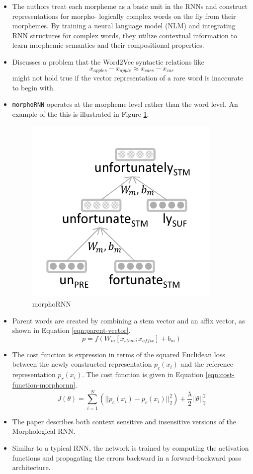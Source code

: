 \documentclass[11pt,a4paper]{article}
\begin{document}
  \begin{itemize}
    \item 
    The authors treat each morpheme as a basic unit in the RNNs and construct representations for morpho- logically complex words on the fly from their morphemes. By training a neural language model (NLM) and integrating RNN structures for complex words, they utilize contextual information to learn morphemic semantics and their compositional properties.
    \item 
    Discusses a problem that the Word2Vec syntactic relations like $$x_{apples} - x_{apple} \approx x_{cars} - x_{car}$$ might not hold true if the vector representation of a rare word is inaccurate to begin with.
    \item 
    \texttt{morphoRNN} operates at the morpheme level rather than the word level. An example of the this is illustrated in Figure \ref{fig:rnn-morphology}.
    \begin{figure}[ht]
      \centering
      \includegraphics[width=.4\textwidth]{rnn-morphology.png}
      \caption{morphoRNN}
      \label{fig:rnn-morphology}
    \end{figure}
    \item 
    Parent words are created by combining a stem vector and an affix vector, as shown in Equation \ref{eqn:parent-vector}.
    \begin{equation} \label{eqn:parent-vector}
      p = f (W_m [x_{stem} ; x_{affix}] + b_m)
    \end{equation}
    \item 
    The cost function is expression in terms of the squared Euclidean loss between the newly constructed representation $p_c(x_i)$ and the reference representation $p_r(x_i)$. The cost function is given in Equation \ref{eqn:cost-function-morphornn}.
    \begin{equation} \label{eqn:cost-function-morphornn}
      J(\theta) = \sum_{i=1}^N (|| p_c(x_i) - p_c(x_i) ||^2_2) + \frac{\lambda}{2} ||\theta||^2_2
    \end{equation}
    \item 
    The paper describes both context sensitive and insensitive versions of the Morphological RNN.
    \item 
    Similar to a typical RNN, the network is trained by computing the activation functions and propagating the errors backward in a forward-backward pass architecture.
  \end{itemize}
\end{document}

